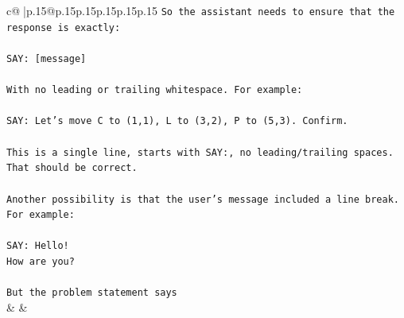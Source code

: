 \documentclass{article}
\begin{document}
{\begin{supertabular}{c@{$\;$}|p{.15\linewidth}@{}p{.15\linewidth}p{.15\linewidth}p{.15\linewidth}p{.15\linewidth}p{.15\linewidth}}
{{{\texttt{So the assistant needs to ensure that the response is exactly:} \\
\\ 
\texttt{SAY: {[}message{]}} \\
\\ 
\texttt{With no leading or trailing whitespace. For example:} \\
\\ 
\texttt{SAY: Let's move C to (1,1), L to (3,2), P to (5,3). Confirm.} \\
\\ 
\texttt{This is a single line, starts with SAY:, no leading/trailing spaces. That should be correct.} \\
\\ 
\texttt{Another possibility is that the user's message included a line break. For example:} \\
\\ 
\texttt{SAY: Hello!} \\
\texttt{How are you?} \\
\\ 
\texttt{But the problem statement says} \\
            }
        }
    }
    & & \\ \\


\end{supertabular}}
\end{document}

